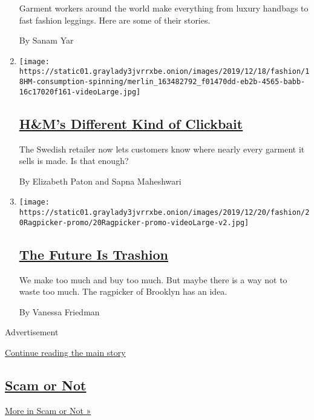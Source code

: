 \begin{enumerate}
  Garment workers around the world make everything from luxury handbags
  to fast fashion leggings. Here are some of their stories.

  By Sanam Yar
\item
  \texttt{[image: https://static01.graylady3jvrrxbe.onion/images/2019/12/18/fashion/18HM-consumption-spinning/merlin\_163482792\_f01470dd-eb2b-4565-babb-16c17020f161-videoLarge.jpg]}

  \hypertarget{hms-different-kind-of-clickbait}{%
  \subsection{\texorpdfstring{\href{/2019/12/18/fashion/hms-supply-chain-transparency.html}{H\&M's
  Different Kind of
  Clickbait}}{H\&M's Different Kind of Clickbait}}\label{hms-different-kind-of-clickbait}}

  The Swedish retailer now lets customers know where nearly every
  garment it sells is made. Is that enough?

  By Elizabeth Paton and Sapna Maheshwari
\item
  \texttt{[image: https://static01.graylady3jvrrxbe.onion/images/2019/12/20/fashion/20Ragpicker-promo/20Ragpicker-promo-videoLarge-v2.jpg]}

  \hypertarget{the-future-is-trashion}{%
  \subsection{\texorpdfstring{\href{/2019/12/20/style/zero-waste-daniel-trashion.html}{The
  Future Is
  Trashion}}{The Future Is Trashion}}\label{the-future-is-trashion}}

  We make too much and buy too much. But maybe there is a way not to
  waste too much. The ragpicker of Brooklyn has an idea.

  By Vanessa Friedman
\end{enumerate}

Advertisement

\protect\hyperlink{after-mid5}{Continue reading the main story}

\hypertarget{scam-or-not}{%
\subsection{\texorpdfstring{\href{/column/scam-or-not}{Scam or
Not}}{Scam or Not}}\label{scam-or-not}}

\href{/column/scam-or-not}{More in Scam or Not »}

